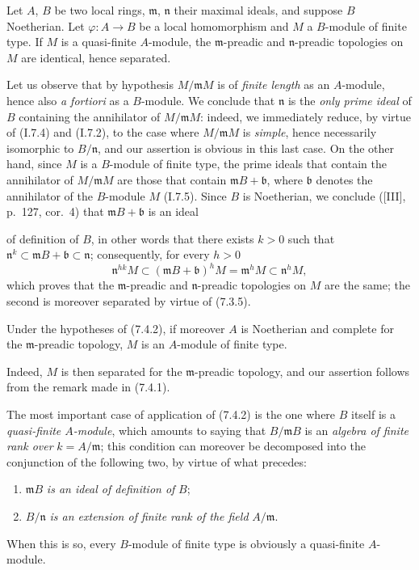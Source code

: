 \begin{proposition}[7.4.2]
\label{0.7.4.2}
Let $A$, $B$ be two local rings, $\mathfrak m$, $\mathfrak n$ their maximal
ideals, and suppose $B$ Noetherian. Let $\varphi:A\to B$ be a
local homomorphism and $M$ a $B$-module of finite type. If $M$ is a quasi-finite
$A$-module, the $\mathfrak m$-preadic and $\mathfrak n$-preadic topologies
on $M$ are identical, hence separated.
\end{proposition}

Let us observe that by hypothesis $M/\mathfrak mM$ is of \emph{finite length} as
an $A$-module, hence also \emph{a fortiori} as a $B$-module. We
conclude that $\mathfrak n$ is the \emph{only prime ideal} of $B$ containing
the annihilator of $M/\mathfrak mM$: indeed, we immediately reduce, by virtue
of (I.7.4) and (I.7.2), to the case where $M/\mathfrak mM$ is \emph{simple}, hence
necessarily isomorphic to $B/\mathfrak n$, and our assertion is obvious
in this last case. On the other hand, since $M$ is a $B$-module of finite type,
the prime ideals that contain the annihilator of $M/\mathfrak mM$ are those
that contain $\mathfrak mB+\mathfrak b$, where $\mathfrak b$ denotes
the annihilator of the $B$-module $M$ (I.7.5). Since $B$ is Noetherian, we conclude
([III], p.~127, cor.~4) that $\mathfrak mB+\mathfrak b$ is an ideal


of definition of $B$, in other words that there exists $k>0$ such that
$\mathfrak n^k\subset\mathfrak mB+\mathfrak b\subset\mathfrak n$; consequently,
for every $h>0$
\[
  \mathfrak n^{hk}M
  \subset(\mathfrak mB+\mathfrak b)^hM
  =\mathfrak m^hM
  \subset\mathfrak n^hM,
\]
which proves that the $\mathfrak m$-preadic and
$\mathfrak n$-preadic topologies on $M$ are the same; the second is moreover
separated by virtue of (7.3.5).

\begin{corollary}[7.4.3]
\label{0.7.4.3}
Under the hypotheses of (7.4.2), if moreover $A$ is Noetherian and complete for
the $\mathfrak m$-preadic topology, $M$ is an $A$-module of finite type.
\end{corollary}

Indeed, $M$ is then separated for the $\mathfrak m$-preadic topology, and
our assertion follows from the remark made in (7.4.1).

\begin{env}[7.4.4]
\label{0.7.4.4}
The most important case of application of (7.4.2) is the one where $B$
itself is a \emph{quasi-finite $A$-module}, which amounts to saying that
$B/\mathfrak mB$ is an \emph{algebra of finite rank over}
$k=A/\mathfrak m$; this condition can moreover be decomposed into the
conjunction of the following two, by virtue of what precedes:
\begin{enumerate}
  \item[(i)] $\mathfrak mB$ \emph{is an ideal of definition of} $B$;
  \item[(ii)] $B/\mathfrak n$ \emph{is an extension of finite rank of the field}
  $A/\mathfrak m$.
\end{enumerate}
When this is so, every $B$-module of finite type is obviously a
quasi-finite $A$-module.
\end{env}

